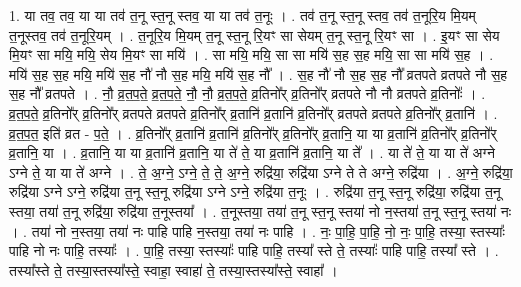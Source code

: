 \documentclass[17pt]{extarticle}
\begin{document}
1. या तव॒ तव॒ या या तव॑ त॒नू स्त॒नू स्तव॒ या या तव॑ त॒नूः । . तव॑ त॒नू स्त॒नू स्तव॒ तव॑ त॒नूरि॒य मि॒यम् त॒नूस्तव॒ तव॑ त॒नूरि॒यम् । . त॒नूरि॒य मि॒यम् त॒नू स्त॒नू रि॒यꣳ सा सेयम् त॒नू स्त॒नू रि॒यꣳ सा । . इ॒यꣳ सा सेय मि॒यꣳ सा मयि॒ मयि॒ सेय मि॒यꣳ सा मयि॑ । . सा मयि॒ मयि॒ सा सा मयि॑ स॒ह स॒ह मयि॒ सा सा मयि॑ स॒ह । . मयि॑ स॒ह स॒ह मयि॒ मयि॑ स॒ह नौ॑ नौ स॒ह मयि॒ मयि॑ स॒ह नौ᳚ । . स॒ह नौ॑ नौ स॒ह स॒ह नौ᳚ व्रतपते व्रतपते नौ स॒ह स॒ह नौ᳚ व्रतपते । . नौ॒ व्र॒त॒प॒ते॒ व्र॒त॒प॒ते॒ नौ॒ नौ॒ व्र॒त॒प॒ते॒ व्र॒तिनो᳚र् व्र॒तिनो᳚र् व्रतपते नौ नौ व्रतपते व्र॒तिनोः᳚ । . व्र॒त॒प॒ते॒ व्र॒तिनो᳚र् व्र॒तिनो᳚र् व्रतपते व्रतपते व्र॒तिनो᳚र् व्र॒तानि॑ व्र॒तानि॑ व्र॒तिनो᳚र् व्रतपते व्रतपते व्र॒तिनो᳚र् व्र॒तानि॑ । . व्र॒त॒प॒त॒ इति॑ व्रत - प॒ते॒ । . व्र॒तिनो᳚र् व्र॒तानि॑ व्र॒तानि॑ व्र॒तिनो᳚र् व्र॒तिनो᳚र् व्र॒तानि॒ या या व्र॒तानि॑ व्र॒तिनो᳚र् व्र॒तिनो᳚र् व्र॒तानि॒ या । . व्र॒तानि॒ या या व्र॒तानि॑ व्र॒तानि॒ या ते॑ ते॒ या व्र॒तानि॑ व्र॒तानि॒ या ते᳚ । . या ते॑ ते॒ या या ते॑ अग्ने ऽग्ने ते॒ या या ते॑ अग्ने । . ते॒ अ॒ग्ने॒ ऽग्ने॒ ते॒ ते॒ अ॒ग्ने॒ रुद्रि॑या॒ रुद्रि॑या ऽग्ने ते ते अग्ने॒ रुद्रि॑या । . अ॒ग्ने॒ रुद्रि॑या॒ रुद्रि॑या ऽग्ने ऽग्ने॒ रुद्रि॑या त॒नू स्त॒नू रुद्रि॑या ऽग्ने ऽग्ने॒ रुद्रि॑या त॒नूः । . रुद्रि॑या त॒नू स्त॒नू रुद्रि॑या॒ रुद्रि॑या त॒नू स्तया॒ तया॑ त॒नू रुद्रि॑या॒ रुद्रि॑या त॒नूस्तया᳚ । . त॒नूस्तया॒ तया॑ त॒नू स्त॒नू स्तया॑ नो न॒स्तया॑ त॒नू स्त॒नू स्तया॑ नः । . तया॑ नो न॒स्तया॒ तया॑ नः पाहि पाहि न॒स्तया॒ तया॑ नः पाहि । . नः॒ पा॒हि॒ पा॒हि॒ नो॒ नः॒ पा॒हि॒ तस्या॒ स्तस्याः᳚ पाहि नो नः पाहि॒ तस्याः᳚ । . पा॒हि॒ तस्या॒ स्तस्याः᳚ पाहि पाहि॒ तस्या᳚ स्ते ते॒ तस्याः᳚ पाहि पाहि॒ तस्या᳚ स्ते । . तस्या᳚स्ते ते॒ तस्या॒स्तस्या᳚स्ते॒ स्वाहा॒ स्वाहा॑ ते॒ तस्या॒स्तस्या᳚स्ते॒ स्वाहा᳚ । \newline
\end{document}
